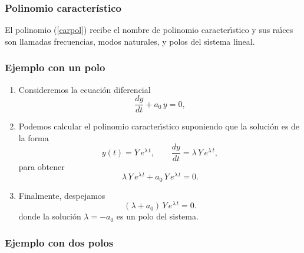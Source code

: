 \subsubsection{Polinomio característico}

El polinomio (\ref{carpol}) recibe el nombre de polinomio
caracter\'{\i}stico y sus ra\'{\i}ces son llamadas frecuencias, modos
naturales, y polos del sistema lineal.

\subsubsection{Ejemplo con un polo}

\begin{enumerate}

\item Consideremos la ecuaci\'{o}n diferencial 
\begin{equation}
        \frac{dy}{dt}+a_{0} \, y = 0,
\end{equation}

\item Podemos calcular el polinomio caracter\'{\i}stico suponiendo que
  la soluci\'{o}n es de la forma
\begin{equation}
        y\left( t\right) = Y \, e^{\lambda \, t}, \qquad
        \frac{dy}{dt}=\lambda \, Y \, e^{\lambda \, t},
\end{equation}
para obtener 
\begin{equation}
        \lambda \, Y \, e^{\lambda \, t}+a_{0} \, Y \, e^{\lambda \, t}= 0.
\end{equation}

\item Finalmente, despejamos
\begin{equation}
        \left(\lambda +a_{0} \right) \, Y \, e^{\lambda \, t}= 0.
\end{equation}
donde la soluci\'{o}n $\lambda = - a_{0}$ es un polo del sistema.
\end{enumerate}

\subsubsection{Ejemplo con dos polos}

